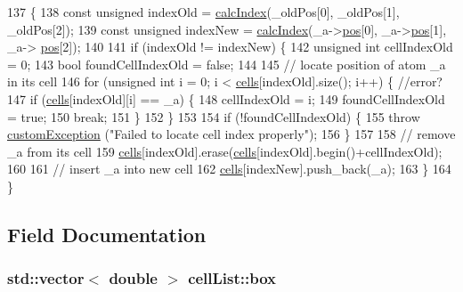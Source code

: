 \begin{DoxyCode}
137                                                                         \{
138     \textcolor{keyword}{const} \textcolor{keywordtype}{unsigned} indexOld = \hyperlink{classcell_list_aa6b843131cd487164a137571c7343cab}{calcIndex}(\_oldPos[0], \_oldPos[1], \_oldPos[2]);
139     \textcolor{keyword}{const} \textcolor{keywordtype}{unsigned} indexNew = \hyperlink{classcell_list_aa6b843131cd487164a137571c7343cab}{calcIndex}(\_a->\hyperlink{classatom_a3ae5f4880e7831d8b2c9fda72b4eb24a}{pos}[0], \_a->\hyperlink{classatom_a3ae5f4880e7831d8b2c9fda72b4eb24a}{pos}[1], \_a->
      \hyperlink{classatom_a3ae5f4880e7831d8b2c9fda72b4eb24a}{pos}[2]);
140 
141     \textcolor{keywordflow}{if} (indexOld != indexNew) \{
142         \textcolor{keywordtype}{unsigned} \textcolor{keywordtype}{int} cellIndexOld = 0;
143         \textcolor{keywordtype}{bool} foundCellIndexOld = \textcolor{keyword}{false};
144 
145         \textcolor{comment}{// locate position of atom \_a in its cell}
146         \textcolor{keywordflow}{for} (\textcolor{keywordtype}{unsigned} \textcolor{keywordtype}{int} i = 0; i < \hyperlink{classcell_list_a10bc0c3ae819293b1e88bc7d1bfdb2aa}{cells}[indexOld].size(); i++) \{ \textcolor{comment}{//error?}
147             \textcolor{keywordflow}{if} (\hyperlink{classcell_list_a10bc0c3ae819293b1e88bc7d1bfdb2aa}{cells}[indexOld][i] == \_a) \{
148                 cellIndexOld = i;
149                 foundCellIndexOld = \textcolor{keyword}{true};
150                 \textcolor{keywordflow}{break};
151             \}
152         \}
153 
154         \textcolor{keywordflow}{if} (!foundCellIndexOld) \{
155             \textcolor{keywordflow}{throw} \hyperlink{classcustom_exception}{customException} (\textcolor{stringliteral}{"Failed to locate cell index properly"});
156         \}
157 
158         \textcolor{comment}{// remove \_a from its cell}
159         \hyperlink{classcell_list_a10bc0c3ae819293b1e88bc7d1bfdb2aa}{cells}[indexOld].erase(\hyperlink{classcell_list_a10bc0c3ae819293b1e88bc7d1bfdb2aa}{cells}[indexOld].begin()+cellIndexOld);
160 
161         \textcolor{comment}{// insert \_a into new cell}
162         \hyperlink{classcell_list_a10bc0c3ae819293b1e88bc7d1bfdb2aa}{cells}[indexNew].push\_back(\_a);
163     \}
164 \}
\end{DoxyCode}


\subsection{Field Documentation}
\hypertarget{classcell_list_ae65748b80d5e06edfa22daaf569f2757}{
\subsubsection[{box}]{\setlength{\rightskip}{0pt plus 5cm}std\-::vector$<$ double $>$ cell\-List\-::box}}\label{classcell_list_ae65748b80d5e06edfa22daaf569f2757}


